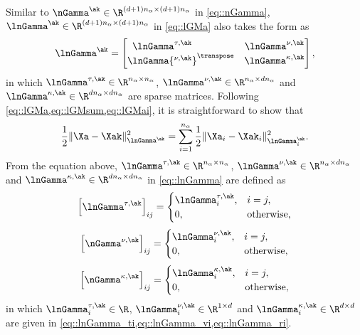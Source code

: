 Similar to $\nGamma^{\ak}\in \R^{(d+1)n_\alpha\times (d+1)n_\alpha}$ in \cref{eq::nGamma},  $\lnGamma^{\ak}\in \R^{(d+1)n_\alpha\times (d+1)n_\alpha}$ in \cref{eq::lGMa} also takes the form as
\begin{equation}\label{eq::lnGamma}
\lnGamma^{\ak}=\begin{bmatrix}
	\lnGamma^{\tau,\ak}\hphantom{{}^\transpose} & \lnGamma^{\nu,\ak}\\
	\lnGamma{\vphantom{H}^{\nu,\ak}}^\transpose & \lnGamma^{\kappa,\ak}
\end{bmatrix},
\end{equation}
in which $\lnGamma^{\tau,\ak}\in \R^{n_\alpha\times n_\alpha}$, $\lnGamma^{\nu,\ak}\in\R^{n_\alpha\times dn_\alpha}$ and $\lnGamma^{\kappa,\ak}\in\R^{dn_\alpha\times dn_\alpha}$ are sparse matrices.
Following \cref{eq::lGMa,eq::lGMsum,eq::lGMai}, it is straightforward to show that
\begin{equation}
	\nonumber
	\frac{1}{2}\|\Xa-\Xak\|_{\lnGamma^{\ak}}^2 = \sum_{i=1}^{n_\alpha} \frac{1}{2}\|\Xa_i-\Xak_i\|_{\lnGamma_i^{\ak}}^2.
\end{equation}
From the equation above, $\lnGamma^{\tau,\ak}\in \R^{n_\alpha\times n_\alpha}$, $\lnGamma^{\nu,\ak}\in\R^{n_\alpha\times dn_\alpha}$ and $\lnGamma^{\kappa,\ak}\in\R^{dn_\alpha\times dn_\alpha}$ in \cref{eq::lnGamma} are defined as
\begin{equation}
\nonumber
\Big[\lnGamma^{\tau,\ak}\Big]_{ij}=\begin{cases}
	\lnGamma_i^{\tau,\ak}, & i=j,\\
	0,& \text{otherwise,}
\end{cases}
\end{equation}
\begin{equation}
\nonumber
\Big[\nGamma^{\nu,\ak}\Big]_{ij}=\begin{cases}
	\lnGamma_i^{\nu,\ak}, & i=j,\\
	0,& \text{otherwise,}
\end{cases}
\end{equation}
\begin{equation}
\nonumber
\Big[\nGamma^{\kappa,\ak}\Big]_{ij}=\begin{cases}
	\lnGamma_i^{\kappa,\ak}, & i=j,\\
	0,& \text{otherwise},
\end{cases}
\end{equation}
in which $\lnGamma_i^{\tau,\ak}\in\R$, $\lnGamma_i^{\nu,\ak}\in\R^{1\times d}$ and $\lnGamma_i^{\kappa,\ak}\in\R^{d\times d}$ are given in \cref{eq::lnGamma_ti,eq::lnGamma_vi,eq::lnGamma_ri}.
